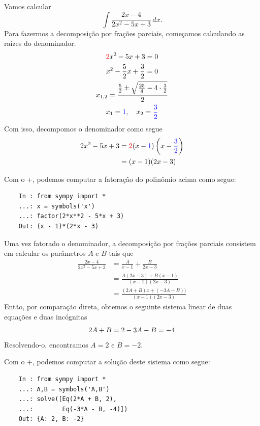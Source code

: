 \begin{ex}
  Vamos calcular
  \begin{equation}
    \int \frac{2x-4}{2x^2 - 5x + 3}\,dx.
  \end{equation}
  Para fazermos a decomposição por frações parciais, começamos calculando as raízes do denominador.
  \begin{gather}
    {\color{red}2}x^2 - 5x + 3 = 0\\
    x^2 - \frac{5}{2}x + \frac{3}{2} = 0\\
    x_{1,2} = \frac{\frac{5}{2} \pm \sqrt{\frac{25}{4} - 4\cdot \frac{3}{2}}}{2}\\
    x_1 = {\color{blue}1},\quad x_2 = {\color{blue}\frac{3}{2}}
  \end{gather}
  Com isso, decompomos o denominador como segue
  \begin{align}
    2x^2 - 5x + 3 &= {\color{red}2}(x-{\color{blue}1})\left(x-{\color{blue}\frac{3}{2}}\right)\\
                  &= (x-1)(2x-3)
  \end{align}

  \ifispython
  Com o {\python}+{\sympy}, podemos computar a fatoração do polinômio acima como segue:
  \begin{lstlisting}
    In : from sympy import *
    ...: x = symbols('x')
    ...: factor(2*x**2 - 5*x + 3)
    Out: (x - 1)*(2*x - 3)
  \end{lstlisting}
  \fi

  Uma vez fatorado o denominador, a decomposição por frações parciais consistem em calcular os parâmetros $A$ e $B$ tais que
  \begin{align}
    \frac{2x-4}{2x^2 - 5x + 3} &= \frac{A}{x-1} + \frac{B}{2x-3}\\
                               &= \frac{A(2x-3) + B(x-1)}{(x-1)(2x-3)}\\
                               &= \frac{(2A+B)x + (-3A - B))}{(x-1)(2x-3)}
  \end{align}
  Então, por comparação direta, obtemos o seguinte sistema linear de duas equações e duas incógnitas
  \begin{equation}
    2A + B = 2\\
    -3A - B = -4
  \end{equation}
  Resolvendo-o, encontramos $A = 2$ e $B = -2$.

  \ifispython
  Com o {\python}+{\sympy}, podemos computar a solução deste sistema como segue:
  \begin{lstlisting}
    In : from sympy import *
    ...: A,B = symbols('A,B')
    ...: solve([Eq(2*A + B, 2),
    ...:        Eq(-3*A - B, -4)])
    Out: {A: 2, B: -2}
  \end{lstlisting}
  \fi


\end{ex}
